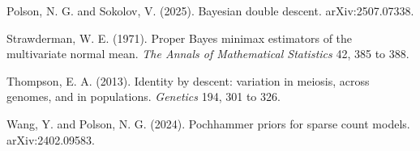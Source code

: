\begin{thebibliography}{}
Polson, N. G. and Sokolov, V. (2025). Bayesian double descent. arXiv:2507.07338.

Strawderman, W. E. (1971). Proper Bayes minimax estimators of the multivariate normal mean.
\emph{The Annals of Mathematical Statistics} 42, 385 to 388.

Thompson, E. A. (2013). Identity by descent: variation in meiosis, across genomes, and
in populations. \emph{Genetics} 194, 301 to 326.

Wang, Y. and Polson, N. G. (2024). Pochhammer priors for sparse count models. arXiv:2402.09583.

\end{thebibliography}
